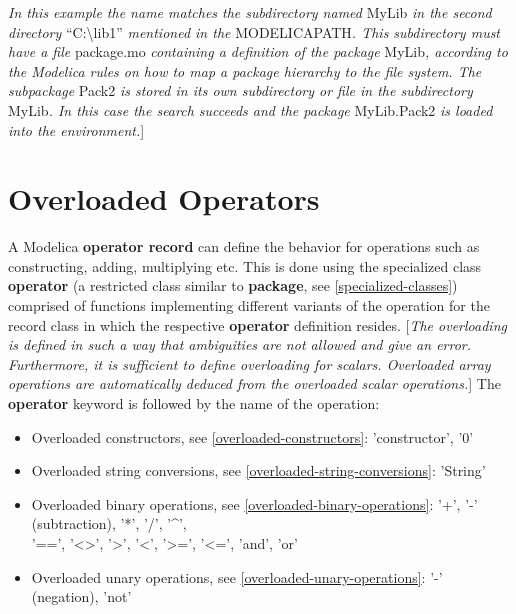 \documentclass[10pt,a4paper]{report}
\renewcommand{\newline}{\hspace*{\fill}\raggedright\linebreak}
\renewcommand{\newline}{\hspace*{\fill}\linebreak}
\def\doublelabel#1{\label{#1}}
\begin{document}
\emph{In this example the name matches the subdirectory named} MyLib
\emph{in the second directory} ``C:\textbackslash{}lib1''
\emph{mentioned in the} MODELICAPATH\emph{. This subdirectory must have
a file} package.mo \emph{containing a definition of the package}
MyLib\emph{, according to the Modelica rules on how to map a package
hierarchy to the file system. The subpackage} Pack2 \emph{is stored in
its own subdirectory or file in the subdirectory} MyLib\emph{. In this
case the search succeeds and the package} MyLib.Pack2 \emph{is loaded
into the environment.}{]}

\chapter{Overloaded Operators}\doublelabel{overloaded-operators}

A Modelica \textbf{operator record} can define the behavior for
operations such as constructing, adding, multiplying etc. This is done
using the specialized class \textbf{operator} (a restricted class
similar to \textbf{package}, see \ref{specialized-classes}) comprised of functions
implementing different variants of the operation for the record class in
which the respective \textbf{operator} definition resides. {[}\emph{The
overloading is defined in such a way that ambiguities are not allowed
and give an error. Furthermore, it is sufficient to define overloading
for scalars. Overloaded array operations are automatically deduced from
the overloaded scalar operations.}{]} The \textbf{operator} keyword is
followed by the name of the operation:

\begin{itemize}
\item
Overloaded constructors, see \ref{overloaded-constructors}:\newline
'constructor', '0'
\item
Overloaded string conversions, see \ref{overloaded-string-conversions}:\newline
'String'
\item
Overloaded binary operations, see \ref{overloaded-binary-operations}:\newline
'+', '-' (subtraction), '*', '/', '\^{}',\\
'==', '\textless{}\textgreater{}', '\textgreater{}', '\textless{}',
'\textgreater{}=', '\textless{}=', 'and', 'or'
\item
Overloaded unary operations, see \ref{overloaded-unary-operations}:\newline
'-' (negation), 'not'
\end{itemize}
\end{document}
